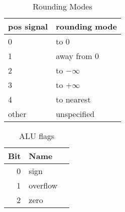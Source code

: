 \begin{table}[ht]
\label{tab:round}
\renewcommand\tabline[2]{#1 & #2\\ \hline}
\begin{center}
\begin{tabular}{|l|l|}
\hline
\tabline {pos signal} {rounding mode}
\hline
\tabline {0}          {to $0$}
\tabline {1}          {away from $0$}
\tabline {2}          {to $-\infty$}
\tabline {3}          {to $+\infty$}
\tabline {4}          {to nearest}
\tabline {other}      {unspecified}
\end{tabular}
\caption{Rounding Modes}
\end{center}
\end{table}

\begin{table}[ht]
\label{tab:flags}
\renewcommand\tabline[2]{#1 & #2\\ \hline}
\begin{center}
\begin{tabular}{|r|l|l|}
\hline
\tabline {Bit} {Name}
\hline
\tabline {0}   {sign}
\tabline {1}   {overflow}
\tabline {2}   {zero}
\end{tabular}
\caption{ALU flags}
\end{center}
\end{table}

